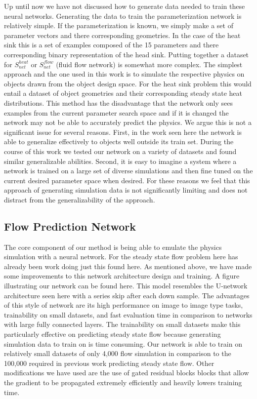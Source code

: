 \documentclass{article} %
\begin{document}
Up until now we have not discussed how to generate data needed to train these neural networks. Generating the data to train the parameterization network is relatively simple. If the parameterization is known, we simply make a set of parameter vectors and there corresponding geometries. In the case of the heat sink this is a set of examples composed of the 15 parameters and there corresponding binary representation of the head sink. Putting together a dataset for $S^{heat}_{net}$ or $S^{flow}_{net}$ (fluid flow network) is somewhat more complex. The simplest approach and the one used in this work is to simulate the respective physics on objects drawn from the object design space. For the heat sink problem this would entail a dataset of object geometries and their corresponding steady state heat distributions. This method has the disadvantage that the network only sees examples from the current parameter search space and if it is changed the network may not be able to accurately predict the physics. We argue this is not a significant issue for several reasons. First, in the work seen here the network is able to generalize effectively to objects well outside its train set. During the course of this work we tested our network on a variety of datasets and found similar generalizable abilities. Second, it is easy to imagine a system where a network is trained on a large set of diverse simulations and then fine tuned on the current desired parameter space when desired. For these reasons we feel that this approach of generating simulation data is not significantly limiting and does not distract from the generalizability of the approach.

\subsection{Flow Prediction Network}

The core component of our method is being able to emulate the physics simulation with a neural network. For the steady state flow problem here has already been work doing just this found here. As mentioned above, we have made some improvements to this network architecture design and training. A figure illustrating our network can be found here. This model resembles the U-network architecture seen here with a series skip after each down sample. The advantages of this style of network are its high performance on image to image type tasks, trainability on small datasets, and fast evaluation time in comparison to networks with large fully connected layers. The trainability on small datasets make this particularly effective on predicting steady state flow because generating simulation data to train on is time consuming. Our network is able to train on relatively small datasets of only 4,000 flow simulation in comparison to the 100,000 required in previous work predicting steady state flow. Other modifications we have used are the use of gated residual blocks blocks that allow the gradient to be propagated extremely efficiently and heavily lowers training time.
\end{document}
